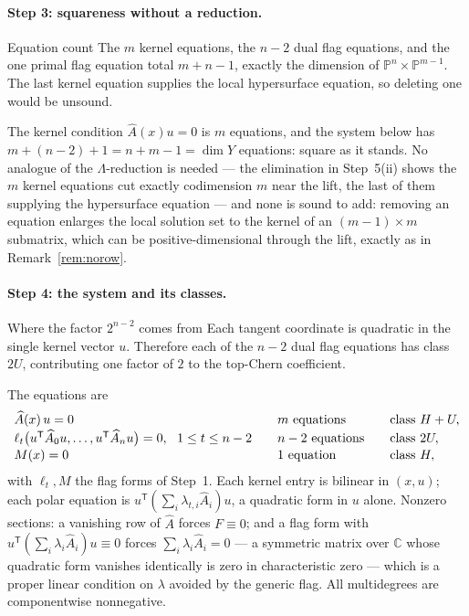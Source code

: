 \documentclass[acmsmall,screen,nonacm]{acmart}
\theoremstyle{definition}
\theoremstyle{remark}
\newcommand{\PP}{\mathbb{P}}
\newcommand{\CC}{\mathbb{C}}
\begin{document}
\paragraph{Step 3: squareness without a reduction.}
\begin{detailbox}{Equation count}
The $m$ kernel equations, the $n-2$ dual flag equations, and the one primal
flag equation total $m+n-1$, exactly the dimension of
$\PP^n\times\PP^{m-1}$.  The last kernel equation supplies the local
hypersurface equation, so deleting one would be unsound.
\end{detailbox}
The kernel condition $\widehat A(x)u=0$ is $m$ equations, and the
system below has $m+(n-2)+1=n+m-1=\dim Y$ equations: square as it
stands.  No analogue of the $\Lambda$-reduction is needed --- the
elimination in Step~5(ii) shows the $m$ kernel equations cut exactly
codimension $m$ near the lift, the last of them supplying the
hypersurface equation --- and none is sound to add: removing an
equation enlarges the local solution set to the kernel of an
$(m-1)\times m$ submatrix, which can be positive-dimensional through
the lift, exactly as in Remark~\ref{rem:norow}.

\paragraph{Step 4: the system and its classes.}
\begin{detailbox}{Where the factor $2^{n-2}$ comes from}
Each tangent coordinate is quadratic in the single kernel vector $u$.
Therefore each of the $n-2$ dual flag equations has class $2U$, contributing
one factor of $2$ to the top-Chern coefficient.
\end{detailbox}
The equations are
\begin{equation}\label{eq:symsystem}
\begin{array}{l@{\qquad}l@{\qquad}l}
  \widehat A(x)\,u=0 & m\ \text{equations} & \text{class }H+U,\\[1pt]
  \ell_t\big(u^{\mathsf T}\widehat A_0u,\dots,
        u^{\mathsf T}\widehat A_nu\big)=0,\ \ 1\le t\le n-2
        & n-2\ \text{equations} & \text{class }2U,\\[1pt]
  M(x)=0 & 1\ \text{equation} & \text{class }H,
\end{array}
\end{equation}
with $\ell_t,M$ the flag forms of Step~1.  Each kernel entry is
bilinear in $(x,u)$; each polar equation is
$u^{\mathsf T}(\sum_i\lambda_{t,i}\widehat A_i)u$, a quadratic form in
$u$ alone.  Nonzero sections: a vanishing row of $\widehat A$ forces
$F\equiv0$; and a flag form with
$u^{\mathsf T}(\sum_i\lambda_i\widehat A_i)u\equiv0$ forces
$\sum_i\lambda_i\widehat A_i=0$ --- a symmetric matrix over $\CC$
whose quadratic form vanishes identically is zero in characteristic
zero --- which is a proper linear condition on $\lambda$ avoided by
the generic flag.  All multidegrees are componentwise nonnegative.
\end{document}
